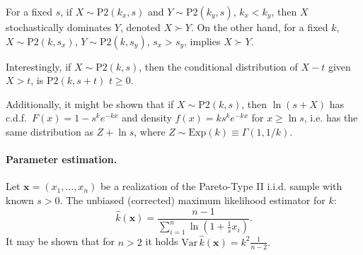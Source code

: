 \documentclass[11pt]{article}\usepackage{graphicx, color}
\newcommand{\vect}[1]{{\mathbf{#1}}}
\theoremstyle{remark}
\theoremstyle{definition}
\begin{document}
For a fixed $s$, if $X\sim \mathrm{P2}(k_x,s)$ and $Y\sim \mathrm{P2}(k_y,s)$,
$k_x<k_y$, then $X$ stochastically dominates $Y$,
denoted $X\succ Y$.
On the other hand, for a fixed $k$, $X\sim \mathrm{P2}(k,s_x)$, $Y\sim \mathrm{P2}(k,s_y)$, $s_x>s_y$,
implies $X \succ Y$.

Interestingly, if $X\sim\mathrm{P2}(k,s)$,
then the conditional distribution of $X-t$ given $X>t$,
is $\mathrm{P2}(k,s+t)$ $t \ge 0$.

Additionally, it might be shown that if $X\sim\mathrm{P2}(k,s)$, 
then $\ln(s+X)$ has c.d.f.~$F(x)=1-s^k e^{-kx}$ and
density $f(x)=k s^k e^{-kx}$ for $x\ge\ln s$,
i.e. has the same distribution as $Z+\ln s$, where
$Z\sim\mathrm{Exp}(k)\equiv \Gamma(1,1/k)$.




\paragraph{Parameter estimation.}
Let $\vect{x}=(x_1,\dots,x_n)$ be a realization of the Pareto-Type II
i.i.d. sample with known $s>0$.
The unbiased (corrected) maximum likelihood estimator for $k$:
% 
\begin{equation*}
\widehat{k}(\vect{x})=\dfrac{n-1}{\sum_{i=1}^n \ln\left(1+\tfrac{1}{s} x_i\right)}.
\end{equation*}
It may be shown that for $n>2$ it holds
$\mathrm{Var}\,\widehat{k}(\vect{x})=k^2 \frac{1}{n-2}.$
\end{document}
